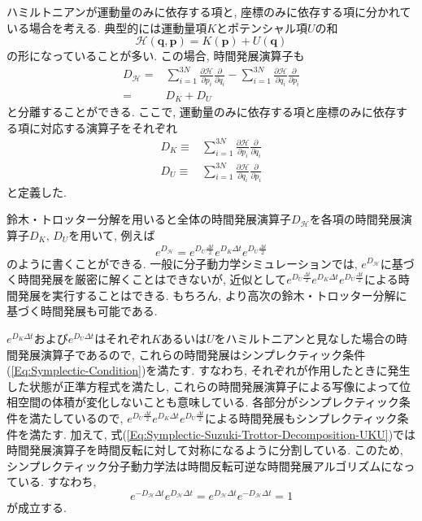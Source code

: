 ハミルトニアンが運動量のみに依存する項と, 座標のみに依存する項に分かれている場合を考える. 典型的には運動量項$K$とポテンシャル項$U$の和
\begin{equation}
  \mathcal{H}(\bm{q}, \bm{p})
  =
  K(\bm{p}) + U(\bm{q})
\end{equation}
の形になっていることが多い. 
この場合, 時間発展演算子も
\begin{align}
  D_{\mathcal{H}}
  =&
  \sum_{i=1}^{3N}
  \frac{\partial \mathcal{H}}{\partial p_{i}}
  \frac{\partial}{\partial q_{i}}
  -
  \sum_{i=1}^{3N}
  \frac{\partial \mathcal{H}}{\partial q_{i}}
  \frac{\partial}{\partial p_{i}}
  \\
  =&
  D_{K} + D_{U}
\end{align}
と分離することができる. ここで, 運動量のみに依存する項と座標のみに依存する項に対応する演算子をそれぞれ
\begin{align}
  D_{K}
  \equiv&
  \sum_{i=1}^{3N}
  \frac{\partial \mathcal{H}}{\partial p_{i}}
  \frac{\partial}{\partial q_{i}}
  \label{Eq:Symplectic-Definition-DK}
  \\
  D_{U}
  \equiv&
  \sum_{i=1}^{3N}
  \frac{\partial \mathcal{H}}{\partial q_{i}}
  \frac{\partial}{\partial p_{i}}
  \label{Eq:Symplectic-Definition-DU}
\end{align}
と定義した. 

鈴木・トロッター分解を用いると全体の時間発展演算子$D_{\mathcal{H}}$を各項の時間発展演算子$D_{K}$, $D_{U}$を用いて, 例えば
\begin{equation}
  e^{D_{\mathcal{H}}}
  =
  e^{D_{U} \frac{\Delta t}{2}}
  e^{D_{K} \Delta t}
  e^{D_{U} \frac{\Delta t}{2}}
  \label{Eq:Symplectic-Suzuki-Trottor-Decomposition-UKU}
\end{equation}
のように書くことができる. 
一般に分子動力学シミュレーションでは, $e^{D_{\mathcal{H}}}$に基づく時間発展を厳密に解くことはできないが, 近似として$e^{D_{U} \frac{\Delta t}{2}}e^{D_{K} \Delta t}e^{D_{U} \frac{\Delta t}{2}}$による時間発展を実行することはできる. もちろん, より高次の鈴木・トロッター分解に基づく時間発展も可能である. 

$e^{D_{K} \Delta t}$および$e^{D_{U} \Delta t}$はそれぞれ$K$あるいは$U$をハミルトニアンと見なした場合の時間発展演算子であるので, これらの時間発展はシンプレクティック条件(\ref{Eq:Symplectic-Condition})を満たす. すなわち, それぞれが作用したときに発生した状態が正準方程式を満たし, これらの時間発展演算子による写像によって位相空間の体積が変化しないことも意味している. 各部分がシンプレクティック条件を満たしているので, $e^{D_{U} \frac{\Delta t}{2}}e^{D_{K} \Delta t}e^{D_{U} \frac{\Delta t}{2}}$による時間発展もシンプレクティック条件を満たす. 加えて, 式(\ref{Eq:Symplectic-Suzuki-Trottor-Decomposition-UKU})では時間発展演算子を時間反転に対して対称になるように分割している.
このため, シンプレクティック分子動力学法は時間反転可逆な時間発展アルゴリズムになっている.
すなわち,
\begin{equation}
  e^{-D_{\mathcal{H}} \Delta t}
  e^{ D_{\mathcal{H}} \Delta t}
  =
  e^{ D_{\mathcal{H}} \Delta t}
  e^{-D_{\mathcal{H}} \Delta t}
  = 1
\end{equation}
が成立する.

